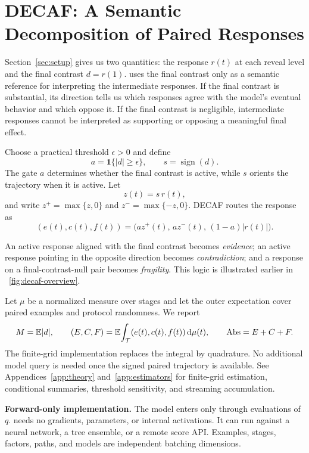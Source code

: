 \section{DECAF: A Semantic Decomposition of Paired Responses}
\label{sec:method}

Section~\ref{sec:setup} gives us two quantities: the response $r(t)$ at each
reveal level and the final contrast $d=r(1)$. \decaf uses the final contrast
only as a semantic reference for interpreting the intermediate responses.
If the final contrast is substantial, its direction tells us which responses
agree with the model's eventual behavior and which oppose it. If the final
contrast is negligible, intermediate responses cannot be interpreted as
supporting or opposing a meaningful final effect.

Choose a practical threshold $\epsilon>0$ and define
\[
a=\mathbf{1}\{|d|\ge \epsilon\},
\qquad
s=\operatorname{sign}(d).
\]
The gate $a$ determines whether the final contrast is active, while $s$
orients the trajectory when it is active. Let
\[
z(t)=s\,r(t),
\]
and write $z^+=\max\{z,0\}$ and $z^-=\max\{-z,0\}$.
DECAF routes the response as
\[
(e(t),c(t),f(t))
=
\bigl(a z^+(t),\,a z^-(t),\,(1-a)|r(t)|\bigr).
\]

An active response aligned with the final contrast becomes
\emph{evidence}; an active response pointing in the opposite direction
becomes \emph{contradiction}; and a response on a final-contrast-null pair
becomes \emph{fragility}. This logic is illustrated earlier in \figurename~\ref{fig:decaf-overview}.


Let $\mu$ be a normalized measure over stages and let the outer expectation cover paired examples and protocol randomness. We report
\begin{equation}
    M=\mathbb{E}|d|,
    \qquad
    (E,C,F)=\mathbb{E}\!\int_{\mathcal{T}}(e(t),c(t),f(t))\,\mathrm{d}\mu(t),
    \qquad
    \mathrm{Abs}=E+C+F.
    \label{eq:population-profile}
\end{equation}
The finite-grid implementation replaces the integral by quadrature. No additional model query is needed once the signed paired trajectory is available. See Appendices~\ref{app:theory} and~\ref{app:estimators} for finite-grid estimation, conditional summaries, threshold sensitivity, and
streaming accumulation.

\textbf{Forward-only implementation.}
The model enters only through evaluations of $q$. \decaf needs no gradients, parameters, or internal activations. It can run against a neural network, a tree ensemble, or a remote score API. Examples, stages, factors, paths, and models are independent batching dimensions.

